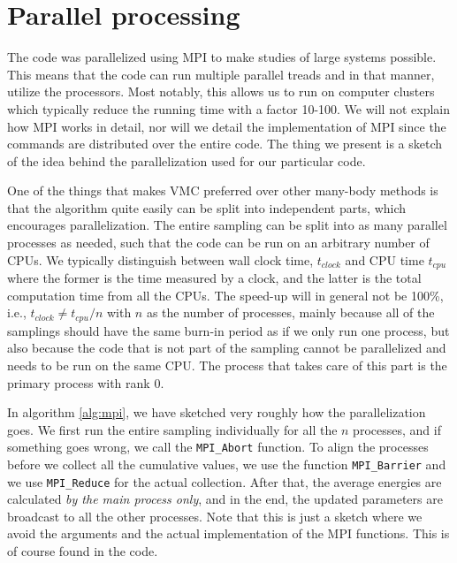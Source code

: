 \section{Parallel processing}
The code was parallelized using MPI to make studies of large systems possible. This means that the code can run multiple parallel treads and in that manner, utilize the processors. Most notably, this allows us to run on computer clusters which typically reduce the running time with a factor 10-100. We will not explain how MPI works in detail, nor will we detail the implementation of MPI since the commands are distributed over the entire code. The thing we present is a sketch of the idea behind the parallelization used for our particular code.

One of the things that makes VMC preferred over other many-body methods is that the algorithm quite easily can be split into independent parts, which encourages parallelization. The entire sampling can be split into as many parallel processes as needed, such that the code can be run on an arbitrary number of CPUs. We typically distinguish between wall clock time, $t_{clock}$ and CPU time $t_{cpu}$ where the former is the time measured by a clock, and the latter is the total computation time from all the CPUs. The speed-up will in general not be 100\%, i.e., $t_{clock}\neq t_{cpu}/n$ with $n$ as the number of processes, mainly because all of the samplings should have the same burn-in period as if we only run one process, but also because the code that is not part of the sampling cannot be parallelized and needs to be run on the same CPU. The process that takes care of this part is the primary process with rank 0.

In algorithm \ref{alg:mpi}, we have sketched very roughly how the parallelization goes. We first run the entire sampling individually for all the $n$ processes, and if something goes wrong, we call the \lstinline|MPI_Abort| function. To align the processes before we collect all the cumulative values, we use the function \lstinline|MPI_Barrier| and we use \lstinline|MPI_Reduce| for the actual collection. After that, the average energies are calculated \textit{by the main process only}, and in the end, the updated parameters are broadcast to all the other processes. Note that this is just a sketch where we avoid the arguments and the actual implementation of the MPI functions. This is of course found in the code.

